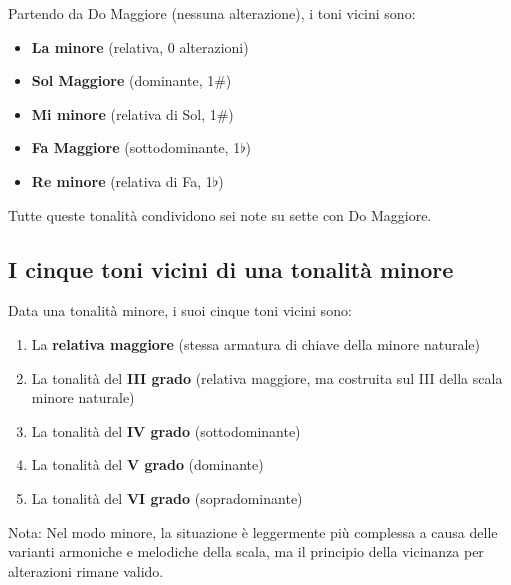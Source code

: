 \begin{esempio}
	\label{ex:toni_vicini_do}
	Partendo da Do Maggiore (nessuna alterazione), i toni vicini sono:
	
	\begin{itemize}
		\item \textbf{La minore} (relativa, 0 alterazioni)
		\item \textbf{Sol Maggiore} (dominante, 1\#)
		\item \textbf{Mi minore} (relativa di Sol, 1\#)
		\item \textbf{Fa Maggiore} (sottodominante, 1$\flat$)
		\item \textbf{Re minore} (relativa di Fa, 1$\flat$)
	\end{itemize}
	
	Tutte queste tonalità condividono sei note su sette con Do Maggiore.
\end{esempio}

\subsection{I cinque toni vicini di una tonalità minore}
\label{subsec:toni_vicini_minore}

\begin{regola}
	\label{reg:toni_vicini_minore}
	Data una tonalità minore, i suoi cinque toni vicini sono:
	
	\begin{enumerate}
		\item La \textbf{relativa maggiore} (stessa armatura di chiave della minore naturale)
		\item La tonalità del \textbf{III grado} (relativa maggiore, ma costruita sul III della scala minore naturale)
		\item La tonalità del \textbf{IV grado} (sottodominante)
		\item La tonalità del \textbf{V grado} (dominante)
		\item La tonalità del \textbf{VI grado} (sopradominante)
	\end{enumerate}
	
	Nota: Nel modo minore, la situazione è leggermente più complessa a causa delle varianti armoniche e melodiche della scala, ma il principio della vicinanza per alterazioni rimane valido.
\end{regola}

